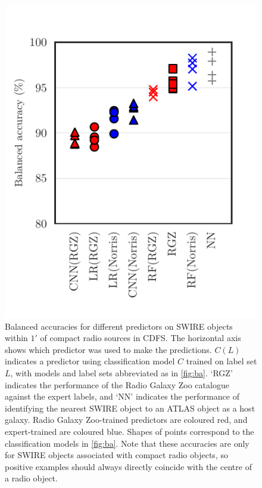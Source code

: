 \documentclass[fleqn,usenatbib,usedcolumn]{mnras}
\begin{document}
    \begin{figure}
      \centering
      \includegraphics[width=0.8\columnwidth]{images/compact-ba.pdf}
      \caption{Balanced accuracies for different predictors on SWIRE objects
        within $1'$ of compact radio sources in CDFS. The horizontal axis
        shows which predictor was used to make the predictions. $C(L)$
        indicates a predictor using classification model $C$ trained on label
        set $L$, with models and label sets abbreviated as in
        \autoref{fig:ba}. `RGZ' indicates the performance of the Radio Galaxy
        Zoo catalogue against the expert labels, and `NN' indicates the
        performance of identifying the nearest SWIRE object to an ATLAS object
        as a host galaxy. Radio Galaxy Zoo-trained predictors are coloured
        red, and expert-trained are coloured blue. Shapes of points correspond
        to the classification models in \autoref{fig:ba}. Note that these
        accuracies are only for SWIRE objects associated with compact radio
        objects, so positive examples should always directly coincide with the
        centre of a radio object.
        \label{fig:compact-ba}}
    \end{figure}
\end{document}
